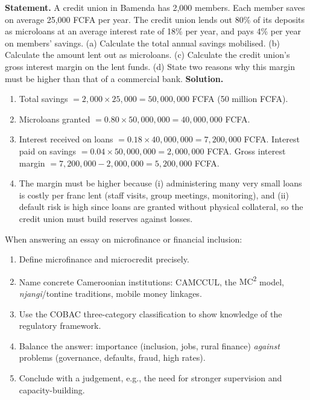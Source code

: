\documentclass[11pt]{article}
\newcommand{\cle}[1]{{\popxbold\color{popdark}#1}}
\begin{document}
\begin{exoresolu}
\textbf{Statement.} A credit union in Bamenda has 2,000 members. Each member saves on average 25,000 FCFA per year. The credit union lends out 80\% of its deposits as microloans at an average interest rate of 18\% per year, and pays 4\% per year on members' savings. (a) Calculate the total annual savings mobilised. (b) Calculate the amount lent out as microloans. (c) Calculate the credit union's gross interest margin on the lent funds. (d) State two reasons why this margin must be higher than that of a commercial bank.
\tcblower
\textbf{Solution.}
\begin{enumerate}
\item Total savings $= 2{,}000 \times 25{,}000 = 50{,}000{,}000$ FCFA (50 million FCFA).
\item Microloans granted $= 0.80 \times 50{,}000{,}000 = 40{,}000{,}000$ FCFA.
\item Interest received on loans $= 0.18 \times 40{,}000{,}000 = 7{,}200{,}000$ FCFA. Interest paid on savings $= 0.04 \times 50{,}000{,}000 = 2{,}000{,}000$ FCFA. Gross interest margin $= 7{,}200{,}000 - 2{,}000{,}000 = 5{,}200{,}000$ FCFA.
\item The margin must be higher because (i) administering many very small loans is costly per franc lent (staff visits, group meetings, monitoring), and (ii) default risk is high since loans are granted without physical collateral, so the credit union must build reserves against losses.
\end{enumerate}
\end{exoresolu}

\begin{methode}
When answering an essay on microfinance or financial inclusion:
\begin{enumerate}
\item Define microfinance and microcredit precisely.
\item Name concrete Cameroonian institutions: \cle{CAMCCUL}, the \cle{MC\textsuperscript{2}} model, \emph{njangi}/tontine traditions, mobile money linkages.
\item Use the COBAC three-category classification to show knowledge of the regulatory framework.
\item Balance the answer: importance (inclusion, jobs, rural finance) \emph{against} problems (governance, defaults, fraud, high rates).
\item Conclude with a judgement, e.g., the need for stronger supervision and capacity-building.
\end{enumerate}
\end{methode}
\end{document}
